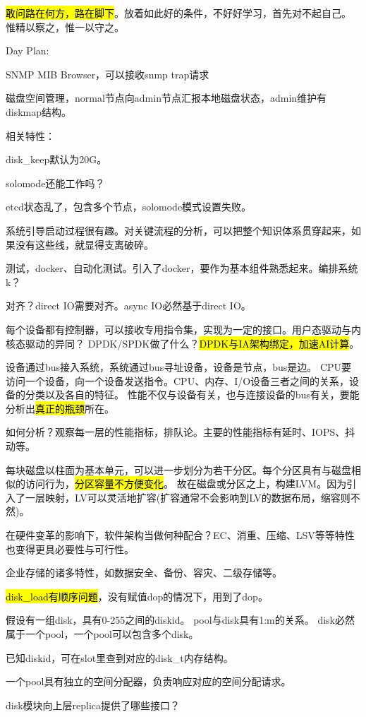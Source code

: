 \hl{敢问路在何方，路在脚下}。放着如此好的条件，不好好学习，首先对不起自己。
惟精以察之，惟一以守之。

Day Plan:
\begin{enumbox}
\item SNMP MIB Browser，可以接收snmp trap请求
\end{enumbox}

磁盘空间管理，normal节点向admin节点汇报本地磁盘状态，admin维护有diskmap结构。

相关特性：
\begin{enumbox}
\item disk\_keep默认为20G。
\item solomode还能工作吗？
\item etcd状态乱了，包含多个节点，solomode模式设置失败。
\end{enumbox}

系统引导启动过程很有趣。对关键流程的分析，可以把整个知识体系贯穿起来，如果没有这些线，就显得支离破碎。

测试，docker、自动化测试。引入了docker，要作为基本组件熟悉起来。编排系统k？

对齐？direct IO需要对齐。async IO必然基于direct IO。

每个设备都有控制器，可以接收专用指令集，实现为一定的接口。用户态驱动与内核态驱动的异同？
DPDK/SPDK做了什么？\hl{DPDK与IA架构绑定，加速AI计算}。

设备通过bus接入系统，系统通过bus寻址设备，设备是节点，bus是边。
CPU要访问一个设备，向一个设备发送指令。CPU、内存、I/O设备三者之间的关系，设备的分类以及各自的特征。
性能不仅与设备有关，也与连接设备的bus有关，要能分析出\hl{真正的瓶颈}所在。

如何分析？观察每一层的性能指标，排队论。主要的性能指标有延时、IOPS、抖动等。

每块磁盘以柱面为基本单元，可以进一步划分为若干分区。每个分区具有与磁盘相似的访问行为，\hl{分区容量不方便变化}。
故在磁盘或分区之上，构建LVM。因为引入了一层映射，LV可以灵活地扩容(扩容通常不会影响到LV的数据布局，缩容则不然)。

在硬件变革的影响下，软件架构当做何种配合？EC、消重、压缩、LSV等等特性也变得更具必要性与可行性。

企业存储的诸多特性，如数据安全、备份、容灾、二级存储等。

\hl{disk\_load有顺序问题}，没有赋值dop的情况下，用到了dop。

假设有一组disk，具有0-255之间的diskid。
pool与disk具有1:m的关系。
disk必然属于一个pool，一个pool可以包含多个disk。

已知diskid，可在slot里查到对应的disk\_t内存结构。

一个pool具有独立的空间分配器，负责响应对应的空间分配请求。

disk模块向上层replica提供了哪些接口？
